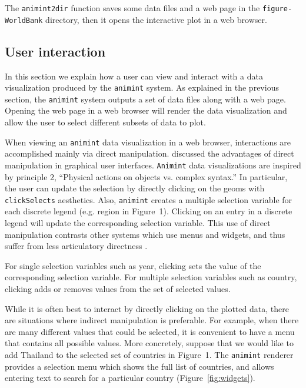 \documentclass[12pt]{article}\usepackage[]{graphicx}\usepackage[]{color}
\begin{document}
The \texttt{animint2dir} function saves some data files and a web page
in the \texttt{figure-WorldBank} directory, then it opens the
interactive plot in a web browser.

\subsection{User interaction}

In this section we explain how a user can view and interact with a
data visualization produced by the \texttt{animint} system. As explained in the
previous section, the \texttt{animint} system outputs a set of data files along
with a web page. Opening the web page in a web browser will render the
data visualization and allow the user to select different subsets of data
to plot.

When viewing an \texttt{animint} data visualization in a web browser,
interactions are accomplished mainly via direct
manipulation. \citet{instrumental-interaction} discussed the
advantages of direct manipulation in graphical user
interfaces. \texttt{Animint} data visualizations are inspired by principle 2,
``Physical actions on objects vs. complex syntax.'' In particular, the
user can update the selection by directly clicking on the geoms with
\texttt{clickSelects} aesthetics. Also, \texttt{animint} creates a multiple
selection variable for each discrete legend (e.g. region in
Figure~1). Clicking on an entry in a discrete legend will update the
corresponding selection variable. This use of direct manipulation
contrasts other systems which use menus and widgets, and thus suffer
from less articulatory directness \citep{Hutchins:1985}.

For single selection variables such as year, clicking sets the value
of the corresponding selection variable. For multiple selection
variables such as country, clicking adds or removes values from the
set of selected values.

While it is often best to interact by directly clicking on the plotted
data, there are situations where indirect manipulation is
preferable. For example, when there are many different values that
could be selected, it is convenient to have a menu that contains all
possible values. More concretely, suppose that we would like to add
Thailand to the selected set of countries in Figure~1. The
\texttt{animint} renderer provides a selection menu which shows the
full list of countries, and allows entering text to search for a
particular country (Figure~\ref{fig:widgets}).
\end{document}

